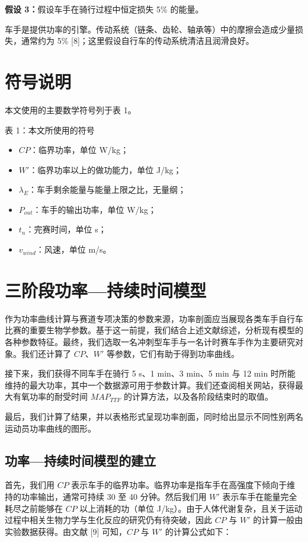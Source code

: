 \documentclass[11pt,a4paper]{ctexart}
\begin{document}
\textbf{假设 3：}假设车手在骑行过程中恒定损失 5\% 的能量。

车手是提供功率的引擎。传动系统（链条、齿轮、轴承等）中的摩擦会造成少量损失，通常约为 5\% [8]；这里假设自行车的传动系统清洁且润滑良好。

\section{符号说明}

本文使用的主要数学符号列于表 1。

表 1：本文所使用的符号

\begin{itemize}
\item $CP$：临界功率，单位 W/kg；
\item $W'$：临界功率以上的做功能力，单位 J/kg；
\item $\lambda_E$：车手剩余能量与能量上限之比，无量纲；
\item $P_{out}$：车手的输出功率，单位 W/kg；
\item $t_n$：完赛时间，单位 s；
\item $v_{wind}$：风速，单位 m/s。
\end{itemize}

\section{三阶段功率—持续时间模型}

作为功率曲线计算与赛道专项决策的参数来源，功率剖面应当展现各类车手自行车比赛的重要生物学参数。基于这一前提，我们结合上述文献综述，分析现有模型的各种参数特征。最终，我们选取一名冲刺型车手与一名计时赛车手作为主要研究对象。我们还计算了 $CP$、$W'$ 等参数，它们有助于得到功率曲线。

接下来，我们获得不同车手在骑行 5 s、1 min、3 min、5 min 与 12 min 时所能维持的最大功率，其中一个数据源可用于参数计算。我们还查阅相关网站，获得最大有氧功率的耐受时间 $MAP_{TTF}$ 的计算方法，以及各阶段结束时的取值。

最后，我们计算了结果，并以表格形式呈现功率剖面，同时给出显示不同性别两名运动员功率曲线的图形。

\subsection{功率—持续时间模型的建立}

首先，我们用 $CP$ 表示车手的临界功率。临界功率是指车手在高强度下倾向于维持的功率输出，通常可持续 30 至 40 分钟。然后我们用 $W'$ 表示车手在能量完全耗尽之前能够在 $CP$ 以上消耗的功（单位 J/kg）。由于人体代谢复杂，且关于运动过程中相关生物力学与生化反应的研究仍有待突破，因此 $CP$ 与 $W'$ 的计算一般由实验数据获得。由文献 [9] 可知，$CP$ 与 $W'$ 的计算公式如下：
\end{document}
